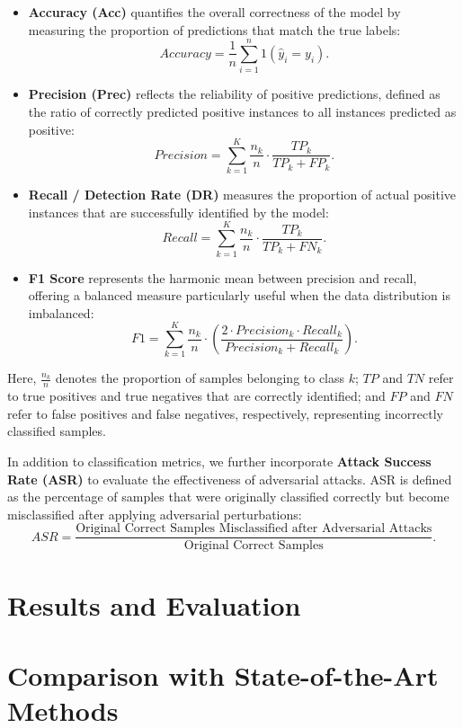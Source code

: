 \documentclass[12pt, a4paper, reqno, oneside]{book}
\begin{document}
\begin{itemize}
    \item \textbf{Accuracy (Acc)} quantifies the overall correctness of the model by measuring the
    proportion of predictions that match the true labels:
    \[
    Accuracy = \frac{1}{n} \sum_{i=1}^{n} 1(\hat{y}_i = y_i).
    \]

    \item \textbf{Precision (Prec)} reflects the reliability of positive predictions, defined as the ratio
    of correctly predicted positive instances to all instances predicted as positive:
    \[
    Precision = \sum_{k=1}^{K} \frac{n_k}{n} \cdot \frac{TP_k}{TP_k + FP_k}.
    \]

    \item \textbf{Recall / Detection Rate (DR)} measures the proportion of actual positive
    instances that are successfully identified by the model:
    \[
    Recall = \sum_{k=1}^{K} \frac{n_k}{n} \cdot \frac{TP_k}{TP_k + FN_k}.
    \]

    \item \textbf{F1 Score} represents the harmonic mean between precision and recall, offering a
    balanced measure particularly useful when the data distribution is imbalanced:
    \[
    F1 = \sum_{k=1}^{K} \frac{n_k}{n} \cdot \left( \frac{2 \cdot Precision_k \cdot Recall_k}{Precision_k + Recall_k} \right).
    \]
\end{itemize}

Here, $\frac{n_k}{n}$ denotes the proportion of samples belonging to class $k$; $TP$ and $TN$
refer to true positives and true negatives that are correctly identified; and $FP$ and $FN$ refer
to false positives and false negatives, respectively, representing incorrectly classified samples.

In addition to classification metrics, we further incorporate \textbf{Attack Success Rate (ASR)} to
evaluate the effectiveness of adversarial attacks. ASR is defined as the percentage of samples
that were originally classified correctly but become misclassified after applying adversarial
perturbations:
\[
ASR = \frac{\text{Original Correct Samples Misclassified after Adversarial Attacks}}{\text{Original Correct Samples}}.
\]


\section{Results and Evaluation}
\label{sec:evaluation}


\section{Comparison with State-of-the-Art Methods}
\label{subsec:comparison_with_sota}
\end{document}
